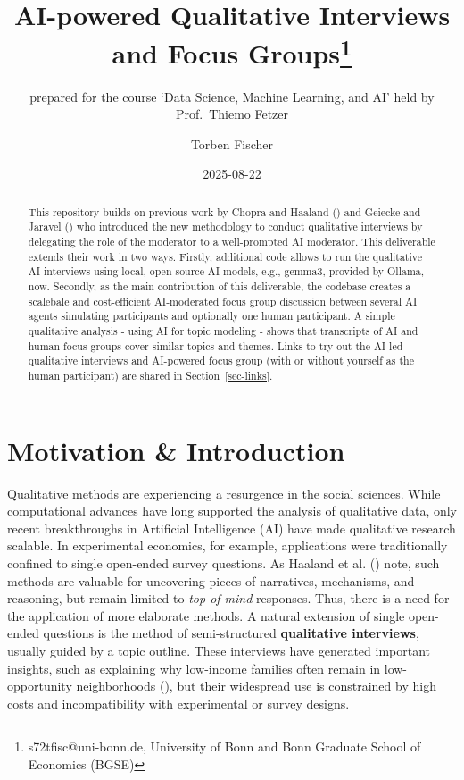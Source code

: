 \documentclass[
  letterpaper,
  DIV=11,
  numbers=noendperiod]{scrartcl}
\title{AI-powered Qualitative Interviews and Focus
Groups\thanks{s72tfisc@uni-bonn.de, University of Bonn and Bonn Graduate
School of Economics (BGSE)}}
\subtitle{prepared for the course `Data Science, Machine Learning, and
AI' held by Prof.~Thiemo Fetzer}
\author{Torben Fischer}
\date{2025-08-22}
\renewcommand*\contentsname{Table of contents}
\newcommand\contentsname{Table of contents}
\begin{document}
\maketitle
\begin{abstract}
This repository builds on previous work by Chopra and Haaland
() and Geiecke and Jaravel
() who introduced the new
methodology to conduct qualitative interviews by delegating the role of
the moderator to a well-prompted AI moderator. This deliverable extends
their work in two ways. Firstly, additional code allows to run the
qualitative AI-interviews using local, open-source AI models, e.g.,
gemma3, provided by Ollama, now. Secondly, as the main contribution of
this deliverable, the codebase creates a scalebale and cost-efficient
AI-moderated focus group discussion between several AI agents simulating
participants and optionally one human participant. A simple qualitative
analysis - using AI for topic modeling - shows that transcripts of AI
and human focus groups cover similar topics and themes. Links to try out
the AI-led qualitative interviews and AI-powered focus group (with or
without yourself as the human participant) are shared in
Section~\ref{sec-links}.
\end{abstract}

\renewcommand*\contentsname{Table of contents}
{
\hypersetup{linkcolor=}
\setcounter{tocdepth}{3}
\tableofcontents
}

\section{Motivation \& Introduction}\label{sec-introduction_motivation}

Qualitative methods are experiencing a resurgence in the social
sciences. While computational advances have long supported the analysis
of qualitative data, only recent breakthroughs in Artificial
Intelligence (AI) have made qualitative research scalable. In
experimental economics, for example, applications were traditionally
confined to single open-ended survey questions. As Haaland et al.
()
note, such methods are valuable for uncovering pieces of narratives,
mechanisms, and reasoning, but remain limited to \emph{top-of-mind}
responses. Thus, there is a need for the application of more elaborate
methods. A natural extension of single open-ended questions is the
method of semi-structured \textbf{qualitative interviews}, usually
guided by a topic outline. These interviews have generated important
insights, such as explaining why low-income families often remain in
low-opportunity neighborhoods
(), but their widespread use is constrained by high costs and
incompatibility with experimental or survey designs.
\end{document}
